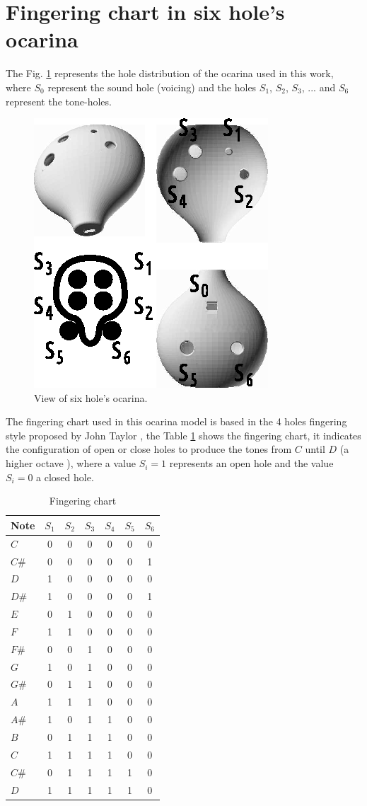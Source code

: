 \documentclass[11pt,twocolumn]{article}
\begin{document}
\section{Fingering chart in six hole's ocarina}
The Fig. \ref{fig:ocarinaview} represents the hole distribution of the ocarina
used in this work, where $S_0$ represent the sound hole (voicing)
and the holes $S_1$, $S_2$, $S_3$, ... and $S_6$ represent the tone-holes.
\begin{figure}[ht!]
\centering
\includegraphics[width=0.50\columnwidth]{ocarina-view.eps}
\caption{View of six hole's ocarina. }
\label{fig:ocarinaview}
\end{figure}
The fingering chart used in this ocarina model is based in the 
4 holes fingering style proposed by John Taylor \cite[pp. 79, 146]{metropolitan1985american}, the
Table \ref{table:chart} shows the fingering chart, it indicates the configuration of open or close holes
to produce the tones from $C$ until $D$ (a higher octave ), where a value $S_i=1$ represents an
open hole and the value $S_i=0$ a closed hole.
\begin{table}[h!]
\center
\begin{tabular}{l|c|c|c|c|c|c}
Note & $S_1$ & $S_2$ & $S_3$ & $S_4$ & $S_5$ & $S_6$ \\ \hline
\hline 
$C$  & 0 & 0 & 0 & 0 & 0 & 0 \\
$C\#$& 0 & 0 & 0 & 0 & 0 & 1 \\
$D$  & 1 & 0 & 0 & 0 & 0 & 0 \\
$D\#$& 1 & 0 & 0 & 0 & 0 & 1 \\
$E$  & 0 & 1 & 0 & 0 & 0 & 0 \\
$F$  & 1 & 1 & 0 & 0 & 0 & 0 \\
$F\#$& 0 & 0 & 1 & 0 & 0 & 0 \\
$G$  & 1 & 0 & 1 & 0 & 0 & 0 \\
$G\#$& 0 & 1 & 1 & 0 & 0 & 0 \\
$A$  & 1 & 1 & 1 & 0 & 0 & 0 \\
$A\#$& 1 & 0 & 1 & 1 & 0 & 0 \\
$B$  & 0 & 1 & 1 & 1 & 0 & 0 \\
$C$& 1 & 1 & 1 & 1 & 0 & 0 \\
$C\#$& 0 & 1 & 1 & 1 & 1 & 0 \\
$D$& 1 & 1 & 1 & 1 & 1 & 0 \\ 
\hline 
\end{tabular}
\vspace{5pt}
\caption{Fingering chart}
\label{table:chart}
\end{table}
\end{document}
